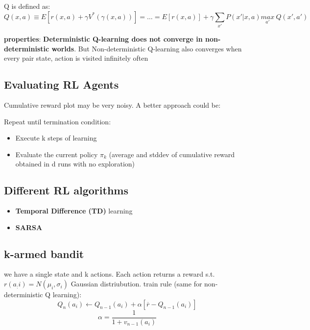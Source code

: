 Q is defined as:
\begin{equation}
    Q(x, a) \equiv E[r(x, a) + \gamma V^{*}(\gamma(x, a))] = \dots = E[r(x, a)] + \gamma \sum_{x'} P(x'|x, a)\underset{a'}{max}\ Q(x', a')
\end{equation}

\textbf{properties}:
\textbf{Deterministic Q-learning does not converge in non-deterministic worlds}. But Non-deterministic Q-learning also converges when every pair state, action is visited infinitely often

\subsection{Evaluating RL Agents}

Cumulative reward plot may be very noisy. A better approach could be:

Repeat until termination condition:
\begin{itemize}
    \item Execute k steps of learning
    \item Evaluate the current policy $\pi_{k}$ (average and stddev of cumulative reward obtained in d runs with no exploration)
\end{itemize}

\subsection{Different RL algorithms}
\begin{itemize}
    \item \textbf{Temporal Difference (TD)} learning
    \item \textbf{SARSA}
\end{itemize}

\subsection{k-armed bandit}
we have a single state and k actions. Each action returns a reward s.t. $r(a_:{i}) = N(\mu_{i}, \sigma_{i})$ Gaussian distriubution. 
train rule (same for non-deterministic Q learning):
\begin{equation}
    Q_{n}(a_{i}) \xleftarrow{} Q_{n-1} (a_{i}) + \alpha [\overline{r} - Q_{n - 1} (a_{i})]
\end{equation}
\begin{equation}
    \alpha = \frac{1}{1 + v_{n - 1}(a_{i})}
\end{equation}

